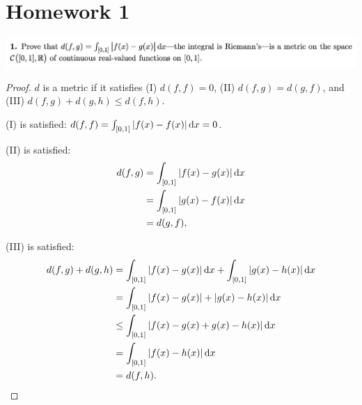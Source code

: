 \section{Homework 1}

\includegraphics[width=400pt]{img/analysis--berkeley-202a--homework-1-a75a.png}

\begin{proof}
  $d$ is a metric if it satisfies (I) $d(f,f) = 0$, (II) $d(f,g) = d(g, f)$, and (III) $d(f,g) + d(g, h) \le d(f, h)$.

  (I) is satisfied: $d(f, f) = \int_{[0,1]}|f(x) - f(x)| \dx = 0$.

  (II) is satisfied:
\begin{align*}
  d(f, g)
  &= \int_{[0,1]}|f(x) - g(x)| \dx \\
  &= \int_{[0,1]}|g(x) - f(x)| \dx \\
  &= d(g, f),
\end{align*}

  (III) is satisfied:
\begin{align*}
  d(f, g) + d(g, h)
  &= \int_{[0,1]} |f(x) - g(x)| \dx + \int_{[0,1]} |g(x) - h(x)| \dx \\
  &= \int_{[0,1]} |f(x) - g(x)| + |g(x) - h(x)| \dx \\
  &\le \int_{[0,1]} |f(x) - g(x) + g(x) - h(x)| \dx \\
  &= \int_{[0,1]} |f(x) - h(x)| \dx \\
  &= d(f, h).
\end{align*}
\end{proof}

